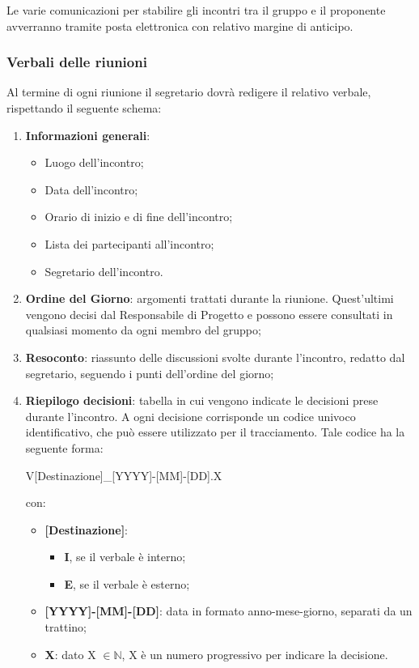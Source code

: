 Le varie comunicazioni per stabilire gli incontri tra il gruppo e il proponente avverranno tramite posta elettronica con relativo margine di anticipo.
\subsubsection{Verbali delle riunioni}
Al termine di ogni riunione il segretario dovrà redigere il relativo verbale, rispettando il seguente
schema:
\begin{enumerate}
	\item \textbf{Informazioni generali}:
		\begin{itemize}
			\item Luogo dell'incontro;
			\item Data dell'incontro;
			\item Orario di inizio e di fine dell'incontro;
			\item Lista dei partecipanti all'incontro;
			\item Segretario dell'incontro.
		\end{itemize}
	\item \textbf{Ordine del Giorno}: argomenti trattati durante la riunione. Quest’ultimi vengono decisi dal Responsabile di Progetto e possono essere consultati in qualsiasi momento da ogni membro del gruppo;
	\item \textbf{Resoconto}: riassunto delle discussioni svolte durante l'incontro, redatto dal segretario, seguendo i punti dell’ordine del giorno;
	\item \textbf{Riepilogo decisioni}: tabella in cui vengono indicate le decisioni prese durante l'incontro.
	A ogni decisione corrisponde un codice univoco identificativo, che può essere utilizzato per il tracciamento.
	Tale codice ha la seguente forma:
	\begin{center}
		V[Destinazione]\_[YYYY]-[MM]-[DD].X	
	\end{center}
	con:
	\begin{itemize}
		\item \textbf{[Destinazione]}:
		\begin{itemize}
			\item \textbf{I}, se il verbale è interno;
			\item \textbf{E}, se il verbale è esterno;
		\end{itemize}
		\item \textbf{[YYYY]-[MM]-[DD]}: data in formato anno-mese-giorno, separati da un trattino;
		\item \textbf{X}: dato X $\in \mathbb{N}$, X è un numero progressivo per indicare la decisione.
	\end{itemize}
\end{enumerate}

